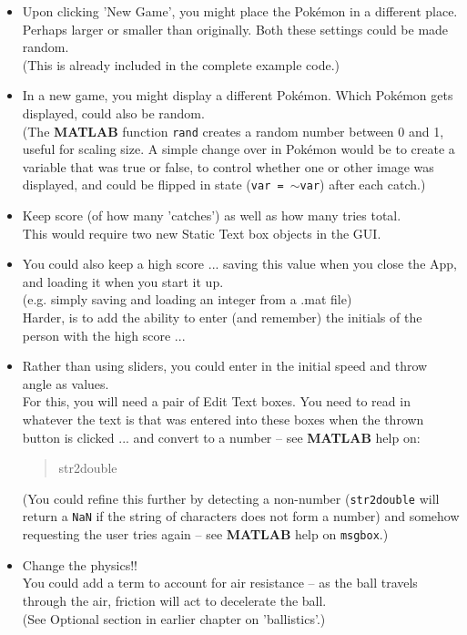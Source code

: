 \documentclass{tufte-book} %
\newenvironment{docspec}{\begin{quotation}\ttfamily\parskip0pt\parindent0pt\ignorespaces}{\end{quotation}}
\begin{document}
\begin{itemize}[noitemsep]
\vspace{1mm}
\item Upon clicking 'New Game', you might place the Pok\'emon in a different place. Perhaps larger or smaller than originally. Both these settings could be made random.
\\(This is already included in the complete example code.)
\vspace{1mm}
\item In a new game, you might display a different Pok\'emon. Which Pok\'emon gets displayed, could also be random. 
\\(The \textbf{MATLAB} function \texttt{rand} creates a random number between 0 and 1, useful for scaling size. A simple change over in Pok\'emon would be to create a variable that was true or false, to control whether one or other image was displayed, and could be flipped in state (\texttt{var = \(\sim\)var}) after each catch.)
\vspace{1mm}
\item Keep score (of how many 'catches') as well as how many tries total.
\\This would require two new \textsf{Static Text} box objects in the GUI.
\vspace{1mm}
\item You could also keep a high score ... saving this value when you close the App, and loading it when you start it up.
\\(e.g. simply saving and loading an integer from a \textsf{.mat} file)
\\Harder, is to add the ability to enter (and remember) the initials of the person with the high score ...
\vspace{1mm}
\item Rather than using sliders, you could enter in the initial speed and throw angle as values. 
\\For this, you will need a pair of Edit Text boxes. You need to read in whatever the text is that was entered into these boxes when the thrown button is clicked ... and convert to a number -- see \textbf{MATLAB} help on:
\begin{docspec}
str2double
\end{docspec}
(You could refine this further by detecting a non-number (\texttt{str2double} will return a \texttt{NaN} if the string of characters does not form a number) and somehow requesting the user tries again -- see \textbf{MATLAB} help on \texttt{msgbox}.)
\vspace{1mm}
\item Change the physics!!
\\You could add a term to account for air resistance -- as the ball travels through the air, friction will act to decelerate the ball.
\\(See Optional section in earlier chapter on 'ballistics'.)
\end{itemize}
\end{document}
